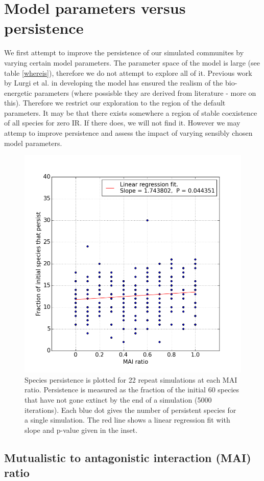 \newpage
\section{Model parameters versus persistence}
\label{sec:parameters_v_stability}

We first attempt to improve the persistence of our simulated communites by varying certain model parameters. The parameter space of the model is large (see table \ref{whereis}), therefore we do not attempt to explore all of it. Previous work by Lurgi et al. \cite{lurgi2015effects} in developing the model has ensured the realism of the bio-energetic parameters (where possisble they are derived from literature - more on this). Therefore we restrict our exploration to the region of the default parameters. It may be that there exists somewhere a region of stable coexistence of all species for zero IR. If there does, we will not find it. However we may attemp to improve persistence and assess the impact of varying sensibly chosen model parameters.

\begin{figure}[h!]
	\centering
	\includegraphics[width=0.5\linewidth]{"figures/mvp1_22reps"}
	\caption{Species persistence is plotted for 22 repeat simulations at each MAI ratio. Persistence is measured as the fraction of the initial 60 species that have not gone extinct by the end of a simulation (5000 iterations). Each blue dot gives the number of persistent species for a single simulation. The red line shows a linear regression fit with slope and p-value given in the inset.}
	\label{fig:mai_vs_persistence}
\end{figure}


\subsection{Mutualistic to antagonistic interaction (MAI) ratio}
\label{sec:mvp}

